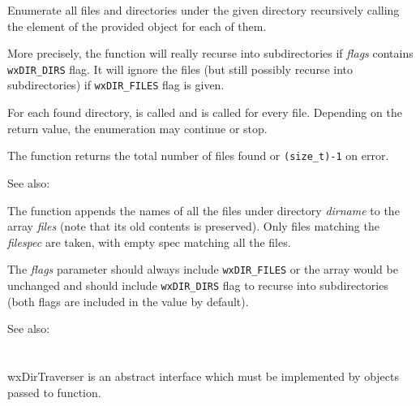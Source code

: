 

Enumerate all files and directories under the given directory recursively
calling the element of the provided  
object for each of them.

More precisely, the function will really recurse into subdirectories if 
{\it flags} contains {\tt wxDIR\_DIRS} flag. It will ignore the files (but
still possibly recurse into subdirectories) if {\tt wxDIR\_FILES} flag is
given.

For each found directory,  is called
and  is called for every file.
Depending on the return value, the enumeration may continue or stop.

The function returns the total number of files found or {\tt (size\_t)-1} on
error.

See also: 



The function appends the names of all the files under directory {\it dirname} 
to the array {\it files} (note that its old contents is preserved). Only files
matching the {\it filespec} are taken, with empty spec matching all the files.

The {\it flags} parameter should always include {\tt wxDIR\_FILES} or the array
would be unchanged and should include {\tt wxDIR\_DIRS} flag to recurse into
subdirectories (both flags are included in the value by default).

See also: 

\section{}\label{wxdirtraverser}

wxDirTraverser is an abstract interface which must be implemented by objects
passed to  function.

